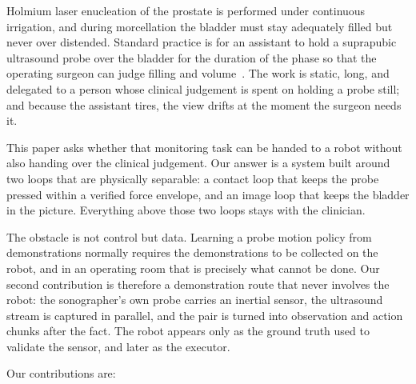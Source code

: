 \documentclass[conference]{IEEEtran}
\begin{document}
Holmium laser enucleation of the prostate is performed under continuous
irrigation, and during morcellation the bladder must stay adequately filled but
never over distended. Standard practice is for an assistant to hold a suprapubic
ultrasound probe over the bladder for the duration of the phase so that the
operating surgeon can judge filling and volume~\cite{jang2024selftraining,trinkler2019bladder}. The work is static, long, and
delegated to a person whose clinical judgement is spent on holding a probe
still; and because the assistant tires, the view drifts at the moment the
surgeon needs it.

This paper asks whether that monitoring task can be handed to a robot without
also handing over the clinical judgement. Our answer is a system built around
two loops that are physically separable: a contact loop that keeps the probe
pressed within a verified force envelope, and an image loop that keeps the
bladder in the picture. Everything above those two loops stays with the
clinician.

The obstacle is not control but data. Learning a probe motion policy from
demonstrations normally requires the demonstrations to be collected on the
robot, and in an operating room that is precisely what cannot be done. Our
second contribution is therefore a demonstration route that never involves the
robot: the sonographer's own probe carries an inertial sensor, the ultrasound
stream is captured in parallel, and the pair is turned into observation and
action chunks after the fact. The robot appears only as the ground truth used to
validate the sensor, and later as the executor.

Our contributions are:
\end{document}
